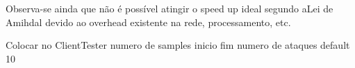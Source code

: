 \documentclass[
	12pt,				%
    oneside,			%
	a4paper,			%
	english,			%
	brazil,				%
	]{abntex2}
\begin{document}
Observa-se ainda que não é possível atingir o speed up ideal segundo aLei de Amihdal devido ao overhead existente na rede, processamento, etc.

Colocar no ClientTester numero de samples inicio fim numero de ataques default 10



\postextual


\end{document}
